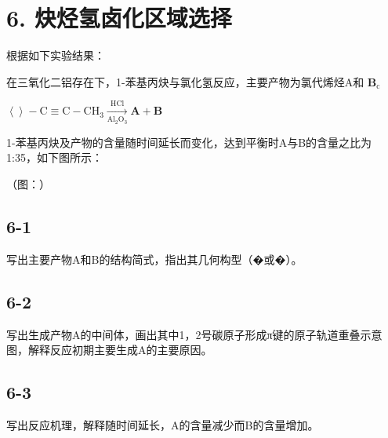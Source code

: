 \section*{6. 炔烃氢卤化区域选择}
根据如下实验结果：

在三氧化⼆铝存在下，1-苯基丙炔与氯化氢反应，主要产物为氯代烯烃A和 $\mathbf { B } _ { \mathrm { c } }$

$
\left\langle \right\rangle - \mathrm{C} \equiv \mathrm{C} - \mathrm{CH} _ {3} \xrightarrow [ \mathrm{Al} _ {2} \mathrm{O} _ {3} ]{\mathrm{HCl}} \mathbf {A} + \mathbf {B}
$

1-苯基丙炔及产物的含量随时间延⻓⽽变化，达到平衡时A与B的含量之⽐为1:35，如下图所⽰：

（图：）

\subsection*{6-1}
写出主要产物A和B的结构简式，指出其⼏何构型（�或�）。

\subsection*{6-2}
写出⽣成产物A的中间体，画出其中1，2号碳原⼦形成π键的原⼦轨道重叠⽰意图，解释反应初期主要⽣成A的主要原因。

\subsection*{6-3}
写出反应机理，解释随时间延⻓，A的含量减少⽽B的含量增加。
